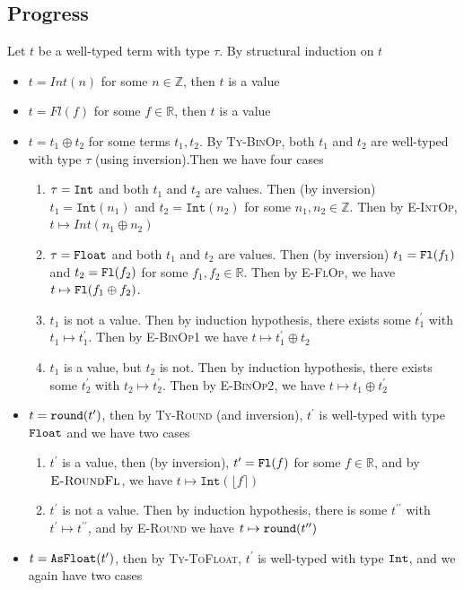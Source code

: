 \documentclass{article}
\newcommand{\round}[1]{\ensuremath\mathtt{round}(#1)}
\newcommand{\fl}[1]{\ensuremath\mathtt{Fl}(#1)}
\newcommand{\nat}[1]{\ensuremath{\mathtt{Int}(#1)}}
\newcommand{\tofloat}[1]{\ensuremath\mathtt{AsFloat}(#1)}
\newcommand{\tyint}{\ensuremath\mathtt{Int}}
\newcommand{\tyfloat}{\ensuremath\mathtt{Float}}
\begin{document}
\subsection*{Progress}
Let $t$ be a well-typed term with type $\tau$. By structural induction on $t$
\begin{itemize}
\item $t = Int(n)$ for some $n\in\mathbb{Z}$, then $t$ is a value 
\item $t = Fl(f)$ for some $f\in\mathbb{R}$, then $t$ is a value
\item $t = t_1 \oplus t_2$ for some terms $t_1,t_2$. By \textsc{Ty-BinOp}, both $t_1$ and $t_2$ are well-typed with type $\tau$ (using inversion).Then we have four cases 
\begin{enumerate}
\item $\tau=\tyint$ and both $t_1$ and $t_2$ are values. Then (by inversion) $t_1 = \nat{n_1}$ and $t_2 = \nat{n_2}$ for some $n_1,n_2\in\mathbb{Z}$. Then by \textsc{E-IntOp}, $t\mapsto Int(n_1 \oplus n_2)$
\item $\tau=\tyfloat$ and both $t_1$ and $t_2$ are values. Then (by inversion) $t_1 = \fl{f_1}$ and $t_2=\fl{f_2}$  for some $f_1,f_2\in\mathbb{R}$. Then by \textsc{E-FlOp}, we have $t\mapsto \fl{f_1\oplus f_2}$.
\item $t_1$ is not a value. Then by induction hypothesis, there exists some $t_1^{\prime}$ with $t_1\mapsto t_1^{\prime}$. Then by \textsc{E-BinOp1} we have $t\mapsto t_1^{\prime} \oplus t_2$
\item $t_1$ is a value, but $t_2$ is not. Then by induction hypothesis, there exists some $t_2^{\prime}$ with $t_2\mapsto t_2^{\prime}$. Then by \textsc{E-BinOp2}, we have $t\mapsto t_1 \oplus t_2^{\prime}$
\end{enumerate}
\item $t = \round{t^{\prime}}$, then by \textsc{Ty-Round} (and inversion), $t^{\prime}$ is well-typed with type $\tyfloat$ and we have two cases 
\begin{enumerate}
\item $t^{\prime}$ is a value, then (by inversion), $t^{\prime} = \fl{f}$ for some $f\in\mathbb{R}$, and by $\textsc{E-RoundFl}$, we have $t\mapsto \nat{\lfloor f \rceil}$
\item $t^{\prime}$ is not a value. Then by induction hypothesis, there is some $t^{\prime\prime}$ with $t^{\prime} \mapsto t^{\prime\prime}$, and by \textsc{E-Round} we have $t\mapsto \round{t^{\prime\prime}}$
\end{enumerate}
\item $t = \tofloat{t^{\prime}}$, then by \textsc{Ty-ToFloat}, $t^{\prime}$ is well-typed with type $\tyint$, and we again have two cases 

\end{itemize}
\end{document}
